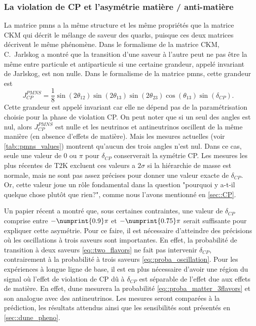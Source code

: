 	        \subsubsection{La violation de CP et l'asymétrie matière / anti-matière}\label{sec::CP_violation}
	            La matrice \gls{pmns} a la même structure et les même propriétés que la matrice CKM qui décrit le mélange de saveur des quarks, puisque ces deux matrices décrivent le même phénomène. Dans le formalisme de la matrice CKM, C.~Jarlskog a montré que la transition d'une saveur à l'autre peut ne pas être la même entre particule et antiparticule si une certaine grandeur, appelé invariant de Jarlskog, est non nulle\cite{Jarlskog1985}. Dans le formalisme de la matrice \gls{pmns}, cette grandeur est
	            \begin{equation}
	                J_{CP}^{PMNS}=\frac{1}{8}\sin(2\theta_{12})\sin(2\theta_{13})\sin(2\theta_{23})\cos(\theta_{13})\sin(\delta_{CP}).
	            \end{equation}
	            Cette grandeur est appelé invariant car elle ne dépend pas de la paramétrisation choisie pour la phase de violation CP. On peut noter que si un seul des angles est nul, alors $J_{CP}^{PMNS}$ est nulle et les neutrinos et antineutrinos oscillent de la même manière (en absence d'effets de matière). Mais les mesures actuelles (voir \autoref{tab::pmns_values}) montrent qu'aucun des trois angles n'est nul. Dans ce cas, seule une valeur de $0$ ou $\pi$ pour $\delta_{CP}$ conserverait la symétrie CP. Les mesures les plus récentes de T2K excluent ces valeurs a $2\sigma$\cite{Abe2018} si la hiérarchie de masse est normale, mais ne sont pas assez précises pour donner une valeur exacte de $\delta_{CP}$. Or, cette valeur joue un rôle fondamental dans la question "pourquoi y a-t-il quelque chose plutôt que rien?", comme nous l'avons mentionné en \autoref{sec::CP}.
	            
	            Un papier récent\cite{Buccella2018}  a montré que, sous certaines contraintes, une valeur de $\delta_{CP}$ comprise entre $-\numprint{0.9}\pi$ et $-\numprint{0.75}\pi$ serait suffisante pour expliquer cette asymétrie. Pour ce faire, il est nécessaire d'atteindre des précisions où les oscillations à trois saveurs sont importantes. En effet, la probabilité de transition à deux saveurs \eqref{eq::two_flavors} ne fait pas intervenir $\delta_{CP}$, contrairement à la probabilité à trois saveurs \eqref{eq::proba_oscillation}. Pour les expériences à longue ligne de base, il est en plus nécessaire d'avoir une région du signal où l'effet de violation de CP dû à $\delta_{CP}$ est séparable de l'effet due aux effets de matière. En effet,  \gls{dune} mesurera la probabilité \eqref{eq::proba_matter_3flavors} et son analogue avec des antineutrinos. Les mesures seront comparées à la prédiction, les résultats attendus ainsi que les sensibilités sont présentés en \autoref{sec::dune_pheno}.
        
        \printbibliography